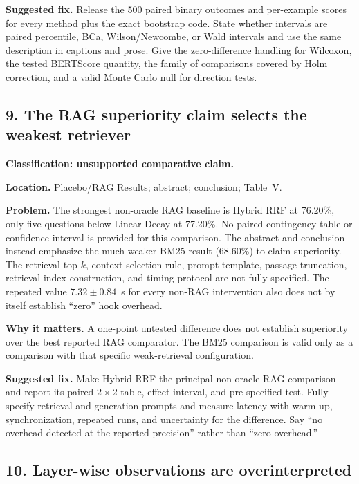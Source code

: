 \documentclass[11pt]{article}
\begin{document}
\textbf{Suggested fix.} Release the 500 paired binary outcomes and per-example scores for every method plus the exact bootstrap code.  State whether intervals are paired percentile, BCa, Wilson/Newcombe, or Wald intervals and use the same description in captions and prose.  Give the zero-difference handling for Wilcoxon, the tested BERTScore quantity, the family of comparisons covered by Holm correction, and a valid Monte Carlo null for direction tests.

\subsection*{9. The RAG superiority claim selects the weakest retriever}

\textbf{Classification: unsupported comparative claim.}

\textbf{Location.} Placebo/RAG Results; abstract; conclusion; Table~V.

\textbf{Problem.} The strongest non-oracle RAG baseline is Hybrid RRF at 76.20\%, only five questions below Linear Decay at 77.20\%.  No paired contingency table or confidence interval is provided for this comparison.  The abstract and conclusion instead emphasize the much weaker BM25 result (68.60\%) to claim superiority.  The retrieval top-$k$, context-selection rule, prompt template, passage truncation, retrieval-index construction, and timing protocol are not fully specified.  The repeated value $7.32\pm0.84$~s for every non-RAG intervention also does not by itself establish ``zero'' hook overhead.

\textbf{Why it matters.} A one-point untested difference does not establish superiority over the best reported RAG comparator.  The BM25 comparison is valid only as a comparison with that specific weak-retrieval configuration.

\textbf{Suggested fix.} Make Hybrid RRF the principal non-oracle RAG comparison and report its paired $2\times2$ table, effect interval, and pre-specified test.  Fully specify retrieval and generation prompts and measure latency with warm-up, synchronization, repeated runs, and uncertainty for the difference.  Say ``no overhead detected at the reported precision'' rather than ``zero overhead.''

\subsection*{10. Layer-wise observations are overinterpreted}
\end{document}
